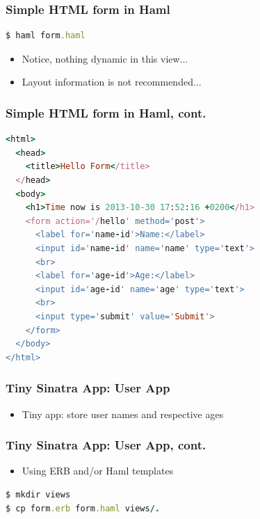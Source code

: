 \documentclass{beamer}
\begin{document}
\begin{frame}[fragile]\frametitle{Simple HTML form in Haml}

  
  
  \begin{lstlisting}[language=ruby, escapechar={^}]
$ haml form.haml
  \end{lstlisting}
  
  \begin{itemize}
    \item Notice, nothing dynamic in this view...
    \item Layout information is not recommended...
  \end{itemize}

\end{frame}




\begin{frame}[fragile]\frametitle{Simple HTML form in Haml, cont.}

  \begin{lstlisting}[language=ruby, escapechar={^}]
<html>
  <head>
    <title>Hello Form</title>
  </head>
  <body>
    <h1>Time now is 2013-10-30 17:52:16 +0200</h1>
    <form action='/hello' method='post'>
      <label for='name-id'>Name:</label>
      <input id='name-id' name='name' type='text'>
      <br>
      <label for='age-id'>Age:</label>
      <input id='age-id' name='age' type='text'>
      <br>
      <input type='submit' value='Submit'>
    </form>
  </body>
</html>
  \end{lstlisting}
  
\end{frame}




\begin{frame}[fragile]\frametitle{Tiny Sinatra App: User App}

  \begin{itemize}
    \item Tiny app: store user names and respective ages
  \end{itemize}
  
  
  
\end{frame}



\begin{frame}[fragile]\frametitle{Tiny Sinatra App: User App, cont.}

  
  
  \begin{itemize}
    \item Using ERB and/or Haml templates
  \end{itemize}
  
  \begin{lstlisting}[language=ruby, escapechar={^}]
$ mkdir views
$ cp form.erb form.haml views/.
  \end{lstlisting}
  
\end{frame}
\end{document}
